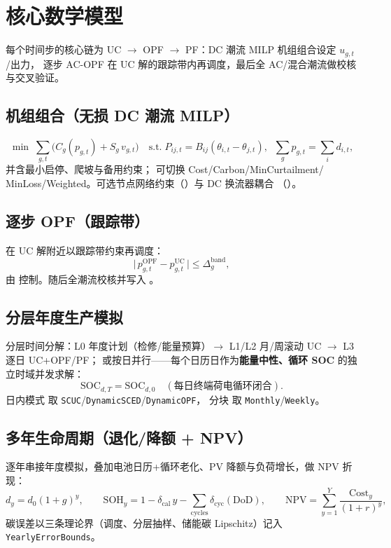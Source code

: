 \documentclass[UTF8,fontset=fandol,a4paper,11pt]{ctexart}
\begin{document}
\section{核心数学模型}
每个时间步的核心链为 UC $\to$ OPF $\to$ PF：DC 潮流 MILP 机组组合设定 $u_{g,t}$/出力，
逐步 AC-OPF 在 UC 解的跟踪带内再调度，最后全 AC/混合潮流做校核与交叉验证。

\subsection{机组组合（无损 DC 潮流 MILP）}
\begin{equation}
\min\;\sum_{g,t}\big(C_g(p_{g,t})+S_g\,v_{g,t}\big)\quad\text{s.t.}\;
P_{ij,t}=B_{ij}(\theta_{i,t}-\theta_{j,t}),\;\;\textstyle\sum_g p_{g,t}=\sum_i d_{i,t},
\end{equation}
并含最小启停、爬坡与备用约束； 可切换 Cost/Carbon/MinCurtailment/
MinLoss/Weighted。可选节点网络约束（）与 DC 换流器耦合
（）。

\subsection{逐步 OPF（跟踪带）}
在 UC 解附近以跟踪带约束再调度：
\begin{equation}
\big|\,p_{g,t}^{\text{OPF}}-p_{g,t}^{\text{UC}}\,\big|\le \Delta_g^{\text{band}},
\end{equation}
由  控制。随后全潮流校核并写入 。

\subsection{分层年度生产模拟}
分层时间分解：L0 年度计划（检修/能量预算）$\to$ L1/L2 月/周滚动 UC $\to$ L3 逐日 UC+OPF/PF；
或按日并行——每个日历日作为\textbf{能量中性、循环 SOC} 的独立时域并发求解：
\begin{equation}
\text{SOC}_{d,T}=\text{SOC}_{d,0}\quad(\text{每日终端荷电循环闭合}).
\end{equation}
日内模式  取 \texttt{SCUC}/\texttt{DynamicSCED}/\texttt{DynamicOPF}，
分块  取 \texttt{Monthly}/\texttt{Weekly}。

\subsection{多年生命周期（退化/降额 + NPV）}
逐年串接年度模拟，叠加电池日历+循环老化、PV 降额与负荷增长，做 NPV 折现：
\begin{equation}
d_y=d_0(1+g)^y,\qquad
\text{SOH}_y=1-\delta_{\text{cal}}\,y-\!\!\sum_{\text{cycles}}\!\!\delta_{\text{cyc}}(\text{DoD}),\qquad
\text{NPV}=\sum_{y=1}^{Y}\frac{\text{Cost}_y}{(1+r)^y},
\end{equation}
碳误差以三条理论界（调度、分层抽样、储能碳 Lipschitz）记入 \texttt{YearlyErrorBounds}。
\end{document}
